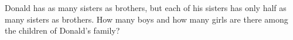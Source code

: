 Donald has as many sisters as brothers, but each of his sisters has only half as many sisters as brothers. How many boys and how many girls are there among the children of Donald's family?
